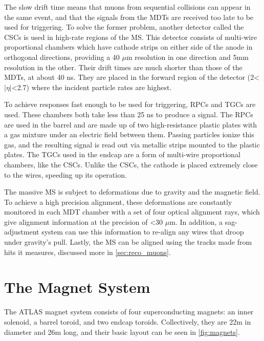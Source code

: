 The slow drift time means that muons from sequential collisions can appear in the same event, and that the signals from the \acp{MDT} are received too late to be used for triggering. To solve the former problem, another detector called the \acp{CSC} is used in high-rate regions of the \ac{MS}. This detector consists of multi-wire proportional chambers which have cathode strips on either side of the anode in orthogonal directions, providing a 40 $\mu$m resolution in one direction and 5mm resolution in the other. Their drift times are much shorter than those of the \acp{MDT}, at about 40 ns. They are placed in the forward region of the detector (2<$|\eta|$<2.7) where the incident particle rates are highest. 

To achieve responses fast enough to be used for triggering, \acp{RPC} and \acp{TGC} are used. These chambers both take less than 25 ns to produce a signal. The \acp{RPC} are used in the barrel and are made up of two high-resistance plastic plates with a gas mixture under an electric field between them. Passing particles ionize this gas, and the resulting signal is read out via metallic strips mounted to the plastic plates. The \acp{TGC} used in the endcap are a form of multi-wire proportional chambers, like the \acp{CSC}. Unlike the \acp{CSC}, the cathode is placed extremely close to the wires, speeding up its operation. 

The massive \ac{MS} is subject to deformations due to gravity and the magnetic field. To achieve a high precision alignment, these deformations are constantly monitored in each \ac{MDT} chamber with a set of four optical alignment rays, which give alignment information at the precision of <30 $\mu$m. In addition, a sag-adjustment system can use this information to re-align any wires that droop under gravity's pull. Lastly, the \ac{MS} can be aligned using the tracks made from hits it measures, discussed more in \autoref{sec:reco_muons}.

\section{The Magnet System}
\label{sec:magnets}

The ATLAS magnet system consists of four superconducting magnets: an inner solenoid, a barrel toroid, and two endcap toroids. Collectively, they are 22m in diameter and 26m long, and their basic layout can be seen in \autoref{fig:magnets}.

